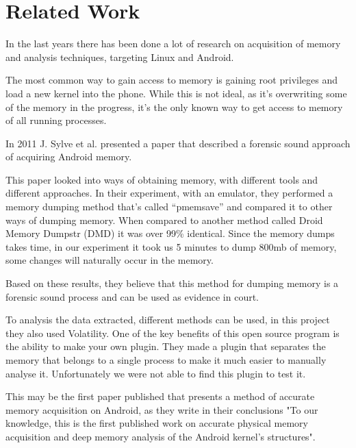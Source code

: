 \section{Related Work}
In the last years there has been done a lot of research on acquisition of memory and analysis
techniques, targeting Linux and Android.

The most common way to gain access to memory is gaining root privileges and load a new kernel into
the phone. While this is not ideal, as it’s overwriting some of the memory in the progress, it’s the
only known way to get access to memory of all running processes.

In 2011 J. Sylve et al. presented a paper that described a forensic sound approach of acquiring
Android memory. \cite{acq_vol_android_mem}

This paper looked into ways of obtaining memory, with different tools and different approaches. In
their experiment, with an emulator, they performed a memory dumping method that’s called
“pmemsave” and compared it to other ways of dumping memory. When compared to another
method called Droid Memory Dumpstr (DMD) it was over 99\% identical. Since the memory dumps takes time, in our
experiment it took us 5 minutes to dump 800mb of memory, some changes will naturally occur in the
memory.

Based on these results, they believe that this method for dumping memory is a forensic sound
process and can be used as evidence in court.

To analysis the data extracted, different methods can be used, in this project they also used
Volatility. One of the key benefits of this open source program is the ability to make your own plugin.
They made a plugin that separates the memory that belongs to a single process to make it much
easier to manually analyse it. Unfortunately we were not able to find this plugin to test it.

This may be the first paper published that presents a method of accurate memory acquisition on
Android, as they write in their conclusions "To our knowledge, this is the first published work on
accurate physical memory acquisition and deep memory analysis of the Android kernel's structures".
